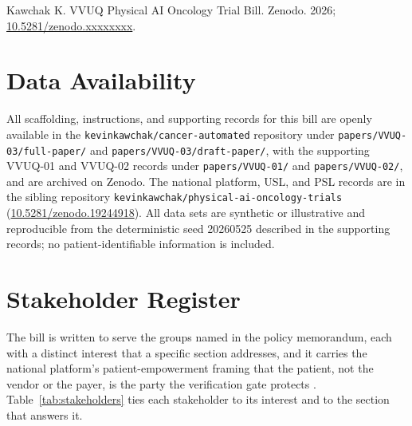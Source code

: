 Kawchak K. VVUQ Physical AI Oncology Trial Bill. Zenodo. 2026;
\href{https://doi.org/10.5281/zenodo.xxxxxxxx}{10.5281/zenodo.xxxxxxxx}.

{}
\section*{Data Availability}
\label{sec:data}

All scaffolding, instructions, and supporting records for this bill are openly
available in the \texttt{kevinkawchak/cancer-automated} repository under
\texttt{papers/VVUQ-03/full-paper/} and \texttt{papers/VVUQ-03/draft-paper/},
with the supporting VVUQ-01 and VVUQ-02 records under \texttt{papers/VVUQ-01/}
and \texttt{papers/VVUQ-02/}, and are archived on Zenodo. The national platform,
USL, and PSL records are in the sibling repository
\texttt{kevinkawchak/physical-ai-oncology-trials}
(\href{https://doi.org/10.5281/zenodo.19244918}{10.5281/zenodo.19244918}). All
data sets are synthetic or illustrative and reproducible from the deterministic
seed 20260525 described in the supporting records; no patient-identifiable
information is included.

{}
\section*{Stakeholder Register}
\label{sec:stakeholders}

The bill is written to serve the groups named in the policy memorandum, each with
a distinct interest that a specific section addresses, and it carries the
national platform's patient-empowerment framing that the patient, not the vendor
or the payer, is the party the verification gate protects
\cite{kawchak2026national}. Table~\ref{tab:stakeholders} ties each stakeholder to
its interest and to the section that answers it.

